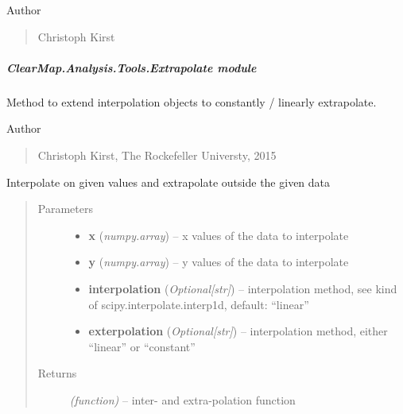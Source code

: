 \documentclass[letterpaper,10pt,english]{sphinxmanual}
\begin{document}
Author
\begin{quote}

Christoph Kirst
\end{quote}


\subparagraph{ClearMap.Analysis.Tools.Extrapolate module}
\label{api/ClearMap.Analysis.Tools:clearmap-analysis-tools-extrapolate-module}\label{api/ClearMap.Analysis.Tools:module-ClearMap.Analysis.Tools.Extrapolate}
Method to extend interpolation objects to constantly / linearly extrapolate.

Author
\begin{quote}

Christoph Kirst, The Rockefeller Universty, 2015
\end{quote}

\begin{fulllineitems}
\label{api/ClearMap.Analysis.Tools:ClearMap.Analysis.Tools.Extrapolate.extrap1d}
Interpolate on given values and extrapolate outside the given data
\begin{quote}\begin{description}
\item[{Parameters}] \leavevmode\begin{itemize}
\item {} 
\textbf{x} (\emph{numpy.array}) --
x values of the data to interpolate

\item {} 
\textbf{y} (\emph{numpy.array}) --
y values of the data to interpolate

\item {} 
\textbf{interpolation} (\emph{Optional{[}str{]}}) --
interpolation method, see kind of scipy.interpolate.interp1d, default: ``linear''

\item {} 
\textbf{exterpolation} (\emph{Optional{[}str{]}}) --
interpolation method, either ``linear'' or ``constant''

\end{itemize}

\item[{Returns}] \leavevmode
\emph{(function)} --
inter- and extra-polation function

\end{description}\end{quote}

\end{fulllineitems}
\end{document}
